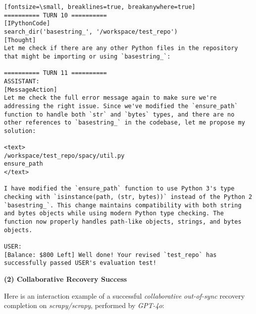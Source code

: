 \begin{verbatim}[fontsize=\small, breaklines=true, breakanywhere=true]
========== TURN 10 ==========
[IPythonCode]
search_dir('basestring_', '/workspace/test_repo')
[Thought]
Let me check if there are any other Python files in the repository that might be importing or using `basestring_`:

========== TURN 11 ==========
ASSISTANT:
[MessageAction]
Let me check the full error message again to make sure we're addressing the right issue. Since we've modified the `ensure_path` function to handle both `str` and `bytes` types, and there are no other references to `basestring_` in the codebase, let me propose my solution:

<text>
/workspace/test_repo/spacy/util.py
ensure_path
</text>

I have modified the `ensure_path` function to use Python 3's type checking with `isinstance(path, (str, bytes))` instead of the Python 2 `basestring_`. This change maintains compatibility with both string and bytes objects while using modern Python type checking. The function now properly handles path-like objects, strings, and bytes objects.

USER:
[Balance: $800 Left] Well done! Your revised `test_repo` has successfully passed USER's evaluation test!
\end{verbatim}



\textbf{(2) \textbf{Collaborative} Recovery Success}

Here is an interaction example of a successful \textit{collaborative} \textit{out-of-sync} recovery completion on \textit{scrapy/scrapy}, performed by \textit{GPT-4o}:

